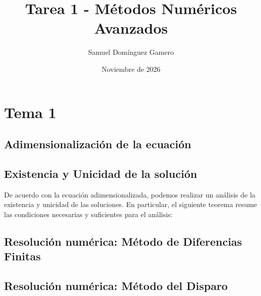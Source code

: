 \documentclass[12pt, a4paper]{article}
\title{\textbf{Tarea 1 - Métodos Numéricos Avanzados}}
\author{Samuel Domínguez Gamero}
\date{Noviembre de 2026}
\begin{document}
	
\maketitle %
\tableofcontents
\section{Tema 1}
\subsection{Adimensionalización de la ecuación}

\subsection{Existencia y Unicidad de la solución}
De acuerdo con la ecuación adimensionalizada, podemos realizar un análisis de la existencia y unicidad de las soluciones. En particular, el siguiente teorema resume las condiciones necesarias y suficientes para el análisis:

\begin{theorem}
\end{theorem}
\subsection{Resolución numérica: Método de Diferencias Finitas}
\subsection{Resolución numérica: Método del Disparo}

	
\end{document}
